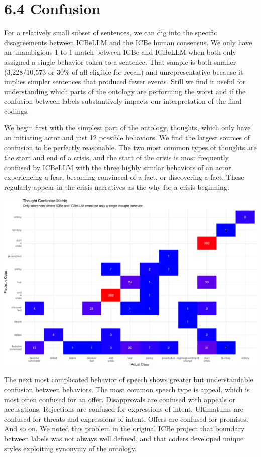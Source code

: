 \documentclass[
  letterpaper,
  DIV=11,
  numbers=noendperiod]{scrartcl}
\begin{document}
\hypertarget{confusion}{%
\section{6.4 Confusion}\label{confusion}}

For a relatively small subset of sentences, we can dig into the specific
disagreements between ICBeLLM and the ICBe human consensus. We only have
an unambigious 1 to 1 match between ICBe and ICBeLLM when both only
assigned a single behavior token to a sentence. That sample is both
smaller (3,228/10,573 or 30\% of all eligible for recall) and
unrepresentative because it implies simpler sentences that produced
fewer events. Still we find it useful for understanding which parts of
the ontology are performing the worst and if the confusion between
labels substantively impacts our interpretation of the final codings.

We begin first with the simplest part of the ontology, thoughts, which
only have an initiating actor and just 12 possible behaviors. We find
the largest sources of confusion to be perfectly reasonable. The two
most common types of thoughts are the start and end of a crisis, and the
start of the crisis is most frequently confused by ICBeLLM with the
three highly similar behaviors of an actor experiencing a fear, becoming
convinced of a fact, or discovering a fact. These regularly appear in
the crisis narratives as the why for a crisis beginning.

\includegraphics{arxiv_Douglass_et_al_2024_ICBeLLM_files/figure-latex/unnamed-chunk-9-1.pdf}

The next most complicated behavior of speech shows greater but
understandable confusion between behaviors. The most common speech type
is appeal, which is most often confused for an offer. Disapprovals are
confused with appeals or accusations. Rejections are confused for
expressions of intent. Ultimatums are confused for threats and
expressions of intent. Offers are confused for promises. And so on. We
noted this problem in the original ICBe project that boundary between
labels was not always well defined, and that coders developed unique
styles exploiting synonymy of the ontology.
\end{document}
